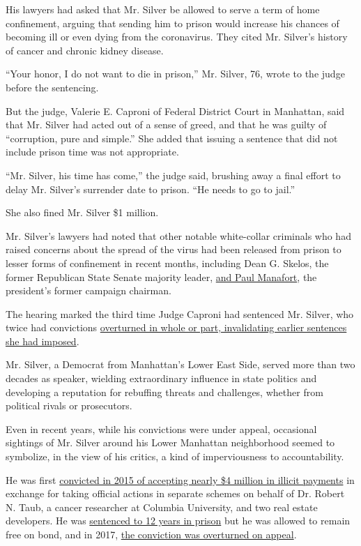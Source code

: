 His lawyers had asked that Mr. Silver be allowed to serve a term of home
confinement, arguing that sending him to prison would increase his
chances of becoming ill or even dying from the coronavirus. They cited
Mr. Silver's history of cancer and chronic kidney disease.

``Your honor, I do not want to die in prison,'' Mr. Silver, 76, wrote to
the judge before the sentencing.

But the judge, Valerie E. Caproni of Federal District Court in
Manhattan, said that Mr. Silver had acted out of a sense of greed, and
that he was guilty of ``corruption, pure and simple.'' She added that
issuing a sentence that did not include prison time was not appropriate.

``Mr. Silver, his time has come,'' the judge said, brushing away a final
effort to delay Mr. Silver's surrender date to prison. ``He needs to go
to jail.''

She also fined Mr. Silver \$1 million.

Mr. Silver's lawyers had noted that other notable white-collar criminals
who had raised concerns about the spread of the virus had been released
from prison to lesser forms of confinement in recent months, including
Dean G. Skelos, the former Republican State Senate majority leader,
\href{https://www.nytimes3xbfgragh.onion/2020/05/13/us/politics/paul-manafort-released-coronavirus.html}{and
Paul Manafort}, the president's former campaign chairman.

The hearing marked the third time Judge Caproni had sentenced Mr.
Silver, who twice had convictions
\href{https://www.nytimes3xbfgragh.onion/2020/01/21/nyregion/sheldon-silver-appeal.html}{overturned
in whole or part, invalidating earlier sentences she had imposed}.

Mr. Silver, a Democrat from Manhattan's Lower East Side, served more
than two decades as speaker, wielding extraordinary influence in state
politics and developing a reputation for rebuffing threats and
challenges, whether from political rivals or prosecutors.

Even in recent years, while his convictions were under appeal,
occasional sightings of Mr. Silver around his Lower Manhattan
neighborhood seemed to symbolize, in the view of his critics, a kind of
imperviousness to accountability.

He was first
\href{https://www.nytimes3xbfgragh.onion/2015/12/01/nyregion/sheldon-silver-guilty-corruption-trial.html}{convicted
in 2015 of accepting nearly \$4 million in illicit payments} in exchange
for taking official actions in separate schemes on behalf of Dr. Robert
N. Taub, a cancer researcher at Columbia University, and two real estate
developers. He was
\href{https://www.nytimes3xbfgragh.onion/2016/05/04/nyregion/sheldon-silver-ex-new-york-assembly-speaker-gets-12-year-prison-sentence.html}{sentenced
to 12 years in prison} but he was allowed to remain free on bond, and in
2017,
\href{https://www.nytimes3xbfgragh.onion/2017/07/13/nyregion/sheldon-silvers-conviction-is-overturned.html}{the
conviction was overturned on appeal}.

